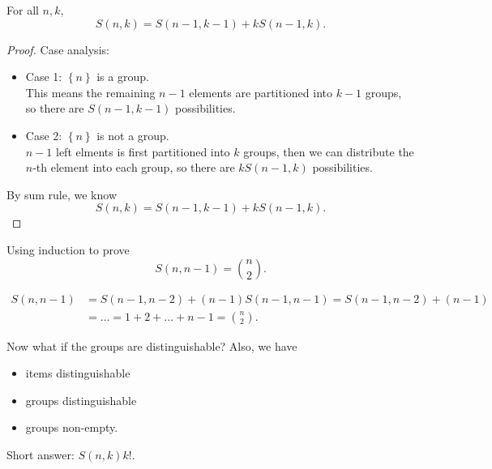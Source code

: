 \begin{proposition}
    For all \(n, k\), 
    \[
        S(n, k) = S(n-1, k-1) + k S(n-1,k).
    \]  
\end{proposition}
\begin{proof}
    Case analysis: 
    \begin{itemize}
        \item Case 1: \(\left\{ n \right\} \) is a group. \\
        This means the remaining \(n-1\) elements are partitioned into \(k-1\) groups, so there are \(S(n-1, k-1)\) possibilities. 
        \item Case 2: \(\left\{ n \right\} \) is not a group.  \\
        \(n - 1\) left elments is first partitioned into \(k\) groups, then we can distribute the \(n\)-th element into each group, so there are \(k S(n-1, k)\) possibilities.    
    \end{itemize}
    By sum rule, we know 
    \[
        S(n, k) = S(n - 1, k - 1) + k S(n - 1, k).
    \]
\end{proof}

\begin{eg}
    Using induction to prove 
    \[
        S(n, n - 1) = \binom{n}{2}.
    \]
\end{eg}
\begin{explanation}
    \begin{align*}
        S(n, n - 1) &= S(n - 1, n - 2) + (n - 1) S(n - 1, n - 1) = S(n - 1, n - 2) + (n - 1) \\
        &= \dots = 1 + 2 + \dots + n - 1 = \binom{n}{2}.
    \end{align*}
\end{explanation}

Now what if the groups are distinguishable? Also, we have
\begin{itemize}
    \item items distinguishable 
    \item groups distinguishable
    \item groups non-empty.
\end{itemize}

Short answer: \(S(n, k) k!\). 